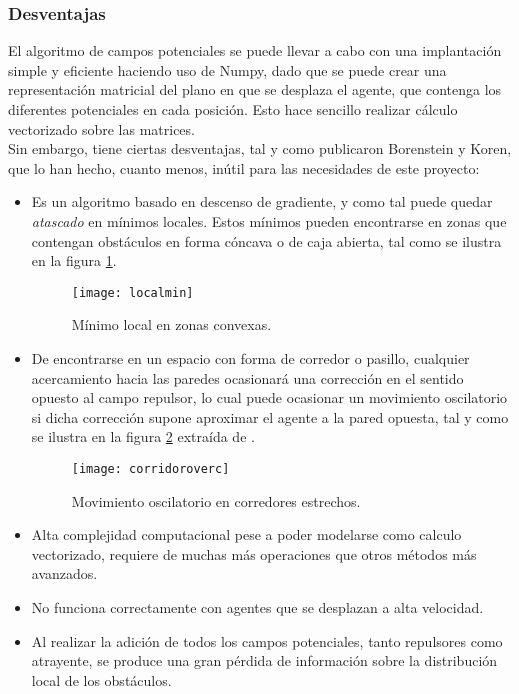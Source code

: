\subsubsection{Desventajas}
El algoritmo de campos potenciales se puede llevar a cabo con una implantación simple y eficiente haciendo uso de Numpy, dado que se puede crear una representación matricial del plano en que se desplaza el agente, que contenga los diferentes potenciales en cada posición. 
Esto hace sencillo realizar cálculo vectorizado sobre las matrices. \\Sin embargo, tiene ciertas desventajas, tal y como publicaron Borenstein y Koren, \citep{art:BorensteinLims} que lo han hecho, cuanto menos, inútil para las necesidades de este proyecto:
\begin{itemize}
\item Es un algoritmo basado en descenso de gradiente, y como tal puede quedar \textit{atascado} en mínimos locales. Estos mínimos pueden encontrarse en zonas que contengan obstáculos en forma cóncava o de caja abierta, tal como se ilustra en la figura \ref{fig:localmin}.
\begin{figure}[H]
	\centering
	\texttt{[image: localmin]}
	\caption{Mínimo local en zonas convexas.}\label{fig:localmin}
\end{figure}
\item \label{subsec:PFlims} De encontrarse en un espacio con forma de corredor o pasillo, cualquier acercamiento hacia las paredes ocasionará una corrección en el sentido opuesto al campo repulsor, lo cual puede ocasionar un movimiento oscilatorio si dicha corrección supone aproximar el agente a la pared opuesta, tal y como se ilustra en la figura \ref{fig:corridoroverc} extraída de \citep{art:BorensteinLims}.
\begin{figure}[H]
	\centering
	\texttt{[image: corridoroverc]}
	\caption{Movimiento oscilatorio en corredores estrechos.}\label{fig:corridoroverc}
\end{figure}
\item Alta complejidad computacional pese a poder modelarse como calculo vectorizado, requiere de muchas más operaciones que otros métodos más avanzados.
\item No funciona correctamente con agentes que se desplazan a alta velocidad. 
\item Al realizar la adición de todos los campos potenciales, tanto repulsores como atrayente, se produce una gran pérdida de información sobre la distribución local de los obstáculos.
\end{itemize} 

